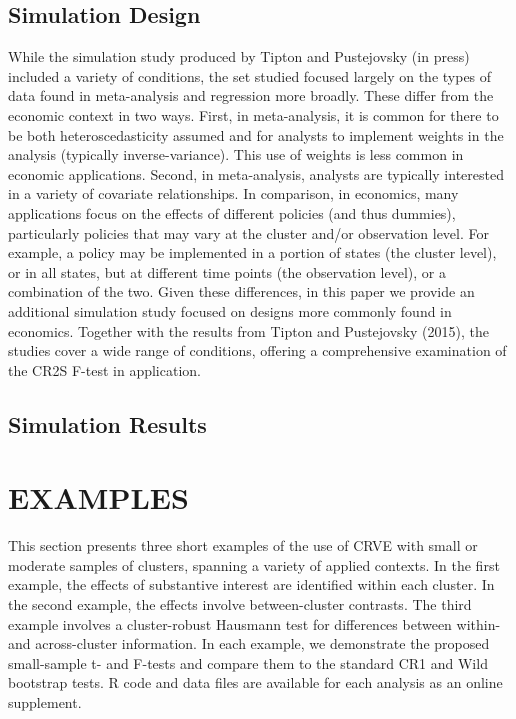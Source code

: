 \documentclass[12pt]{article}\usepackage[]{graphicx}\usepackage[]{color}
\begin{document}
\subsection{Simulation Design}
While the simulation study produced by Tipton and Pustejovsky (in press) included a variety of conditions, the set studied focused largely on the types of data found in meta-analysis and regression more broadly. 
These differ from the economic context in two ways.
First, in meta-analysis, it is common for there to be both heteroscedasticity assumed and for analysts to implement weights in the analysis (typically inverse-variance).
This use of weights is less common in economic applications.
Second, in meta-analysis, analysts are typically interested in a variety of covariate relationships.
In comparison, in economics, many applications focus on the effects of different policies (and thus dummies), particularly policies that may vary at the cluster and/or observation level.
For example, a policy may be implemented in a portion of states (the cluster level), or in all states, but at different time points (the observation level), or a combination of the two.
Given these differences, in this paper we provide an additional simulation study focused on designs more commonly found in economics.
Together with the results from Tipton and Pustejovsky (2015), the studies cover a wide range of conditions, offering a comprehensive examination of the CR2S F-test in application.


\subsection{Simulation Results}


\section{EXAMPLES}
\label{subsec:examples_F}

This section presents three short examples of the use of CRVE with small or moderate samples of clusters, spanning a variety of applied contexts. 
In the first example, the effects of substantive interest are identified within each cluster. 
In the second example, the effects involve between-cluster contrasts. 
The third example involves a cluster-robust Hausmann test for differences between within- and across-cluster information. 
In each example, we demonstrate the proposed small-sample t- and F-tests and compare them to the standard CR1 and Wild bootstrap tests. 
R code and data files are available for each analysis as an online supplement.
\end{document}

